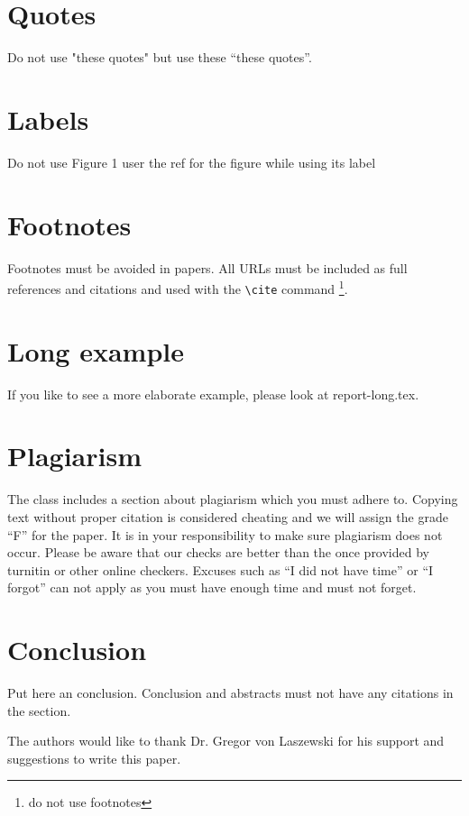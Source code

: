 \section{Quotes}

Do not use "these quotes" but use these ``these quotes''.

\section{Labels}

Do not use Figure 1 user the ref for the figure while using its label

\section{Footnotes}

Footnotes must be avoided in papers. All URLs must be included as full
references and citations and used with the \verb|\cite| command
\footnote{do not use footnotes}.


\section{Long example}

If you like to see a more elaborate example, please look at
report-long.tex. 

\section{Plagiarism}

The class includes a section about plagiarism which you must adhere
to. Copying text without proper citation is considered cheating and we
will assign the grade ``F'' for the paper. It is in your
responsibility to make sure plagiarism does not occur. Please be aware
that our checks are better than the once provided by turnitin or other
online checkers. Excuses such as ``I did not have time'' or ``I
forgot'' can not apply as you must have enough time and must not forget.

\section{Conclusion}

Put here an conclusion. Conclusion and abstracts must not have any
citations in the section.


\begin{acks}

  The authors would like to thank Dr. Gregor von Laszewski for his
  support and suggestions to write this paper.

\end{acks}

